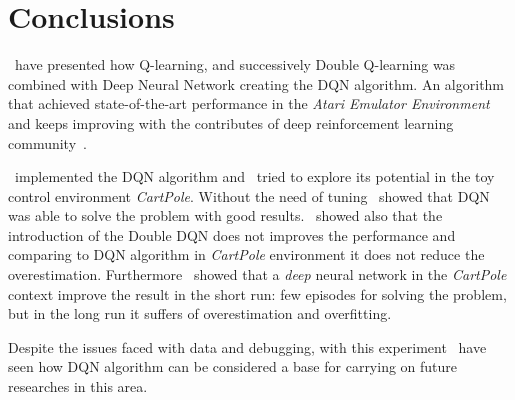\section{Conclusions}

\Auth~have presented how Q-learning, and successively Double Q-learning was combined with Deep Neural Network creating the DQN algorithm. 
An algorithm that achieved state-of-the-art performance in the \textit{Atari Emulator Environment} and keeps improving with the contributes of deep reinforcement learning community~\cite{DBLP:journals/corr/abs-1710-02298}.

\Auth~implemented the DQN algorithm and \auth~tried to explore its potential in the toy control environment \textit{CartPole}. Without the need of tuning \auth~showed that DQN was able to solve the problem with good results. \Auth~showed also that the introduction of the Double DQN does not improves the performance and comparing to DQN algorithm in \textit{CartPole} environment it does not reduce the overestimation. Furthermore \Auth~showed that a \textit{deep} neural network in the \textit{CartPole} context improve the result in the short run: few episodes for solving the problem, but in the long run it suffers of overestimation and overfitting.

Despite the issues faced with data and debugging, with this experiment \auth~have seen how DQN algorithm can be considered a base for carrying on future researches in this area. 